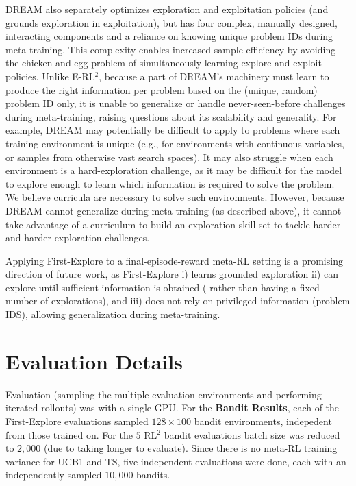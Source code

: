 \documentclass{article}
\begin{document}
DREAM \citep{liu2021decoupling} also separately optimizes exploration and exploitation policies (and grounds exploration in exploitation), but has four complex, manually designed, interacting components and a reliance on knowing unique problem IDs during meta-training. This complexity enables increased sample-efficiency by avoiding the chicken and egg problem of simultaneously learning explore and exploit policies. 
Unlike E-RL\(^2\), because a part of DREAM’s machinery must learn to produce the right information per problem based on the (unique, random) problem ID only, it is unable to generalize or handle never-seen-before challenges during meta-training, raising questions about its scalability and generality. For example, DREAM may potentially be difficult to apply to problems where each training environment is unique (e.g., for environments with continuous variables, or samples from otherwise vast search spaces). It may also struggle when each environment is a hard-exploration challenge, as it may be difficult for the model to explore enough to learn which information is required to solve the problem. We believe curricula are necessary to solve such environments. However, because DREAM cannot generalize during meta-training (as described above), it cannot take advantage of a curriculum to build an exploration skill set to tackle harder and harder exploration challenges.

Applying First-Explore to a final-episode-reward meta-RL setting is a promising direction of future work, as First-Explore i) learns grounded exploration ii) can explore until sufficient information is obtained ( rather than having a fixed number of explorations), and iii) does not rely on privileged information (problem IDS), allowing generalization during meta-training.

\FloatBarrier

\section{Evaluation Details} \label{ap:evaldet}

Evaluation (sampling the multiple evaluation environments and performing iterated rollouts) was with a single GPU. For the \textbf{Bandit Results}, each of the First-Explore evaluations sampled \(128 \times 100\) bandit environments, indepedent from those trained on. For the \(5\) RL\(^2\) bandit evaluations batch size was reduced to \(2,000\) (due to taking longer to evaluate). Since there is no meta-RL training variance for UCB1 and TS, five independent evaluations were done, each with an independently sampled \(10,000\) bandits.
\end{document}
